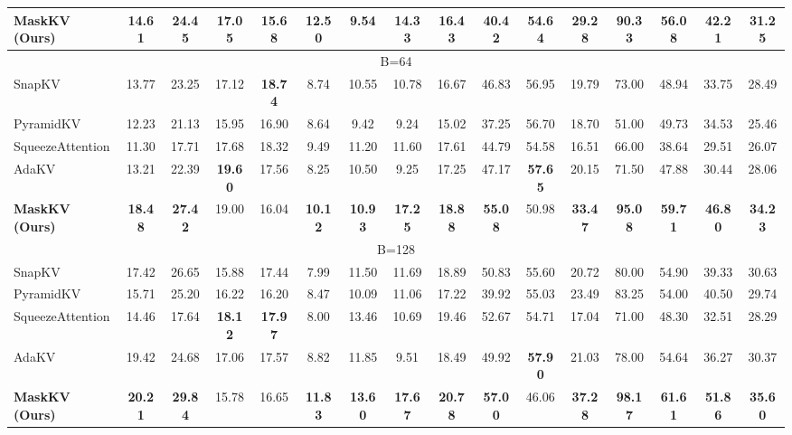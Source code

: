 \begin{table*}[t!]
{\begin{tabular}{@{}l*{15}{c}@{}}
        \rowcolor{lightgreen} \textbf{MaskKV (Ours)} & \textbf{14.61} & \textbf{24.45} & 17.05 & 15.68 & \textbf{12.50} & 9.54 & \textbf{14.33} & \textbf{16.43} & \textbf{40.42} & 54.64 & \textbf{29.28} & \textbf{90.33} & \textbf{56.08} & \textbf{42.21} & \textbf{31.25} \\
        \midrule
        \multicolumn{16}{c}{\small B=64} \\
        \midrule
        SnapKV & 13.77 & 23.25 & 17.12 & \textbf{18.74} & 8.74 & 10.55 & 10.78 & 16.67 & 46.83 & 56.95 & 19.79 & 73.00 & 48.94 & 33.75 & 28.49 \\
        PyramidKV & 12.23 & 21.13 & 15.95 & 16.90 & 8.64 & 9.42 & 9.24 & 15.02 & 37.25 & 56.70 & 18.70 & 51.00 & 49.73 & 34.53 & 25.46 \\
        SqueezeAttention & 11.30 & 17.71 & 17.68 & 18.32 & 9.49 & 11.20 & 11.60 & 17.61 & 44.79 & 54.58 & 16.51 & 66.00 & 38.64 & 29.51 & 26.07 \\
        AdaKV & 13.21 & 22.39 & \textbf{19.60} & 17.56 & 8.25 & 10.50 & 9.25 & 17.25 & 47.17 & \textbf{57.65} & 20.15 & 71.50 & 47.88 & 30.44 & 28.06 \\
        \rowcolor{lightgreen} \textbf{MaskKV (Ours)} & \textbf{18.48} & \textbf{27.42} & 19.00 & 16.04 & \textbf{10.12} & \textbf{10.93} & \textbf{17.25} & \textbf{18.88} & \textbf{55.08} & 50.98 & \textbf{33.47} & \textbf{95.08} & \textbf{59.71} & \textbf{46.80} & \textbf{34.23} \\
        \midrule
        \multicolumn{16}{c}{\small B=128} \\
        \midrule
        SnapKV & 17.42 & 26.65 & 15.88 & 17.44 & 7.99 & 11.50 & 11.69 & 18.89 & 50.83 & 55.60 & 20.72 & 80.00 & 54.90 & 39.33 & 30.63 \\
        PyramidKV & 15.71 & 25.20 & 16.22 & 16.20 & 8.47 & 10.09 & 11.06 & 17.22 & 39.92 & 55.03 & 23.49 & 83.25 & 54.00 & 40.50 & 29.74 \\
        SqueezeAttention & 14.46 & 17.64 & \textbf{18.12} & \textbf{17.97} & 8.00 & 13.46 & 10.69 & 19.46 & 52.67 & 54.71 & 17.04 & 71.00 & 48.30 & 32.51 & 28.29 \\
        AdaKV & 19.42 & 24.68 & 17.06 & 17.57 & 8.82 & 11.85 & 9.51 & 18.49 & 49.92 & \textbf{57.90} & 21.03 & 78.00 & 54.64 & 36.27 & 30.37 \\
        \rowcolor{lightgreen} \textbf{MaskKV (Ours)} & \textbf{20.21} & \textbf{29.84} & 15.78 & 16.65 & \textbf{11.83} & \textbf{13.60} & \textbf{17.67} & \textbf{20.78} & \textbf{57.00} & 46.06 & \textbf{37.28} & \textbf{98.17} & \textbf{61.61} & \textbf{51.86} & \textbf{35.60} \\

\end{tabular}}
\end{table*}
